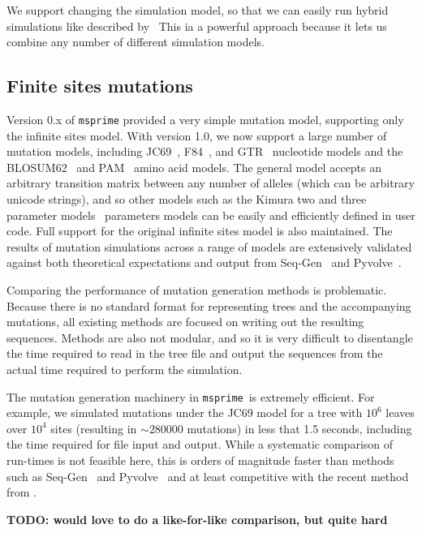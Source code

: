 \documentclass{article}
\newcommand{\msprime}[0]{\texttt{msprime}}
\begin{document}
We support changing the simulation model, so that we can easily
run hybrid simulations like described by~\cite{bhaskar2014distortion}
This ia a powerful approach because it lets us combine any
number of different simulation models.


\subsection*{Finite sites mutations}
Version 0.x of \texttt{msprime} provided a very simple mutation model,
supporting only the infinite sites model.
With version 1.0, we now support a large number of mutation models,
including
JC69~\citep{jukes1969evolution},
F84~\citep{felsenstein1996hidden},
and GTR~\citep{tavare1986some} nucleotide models
and the BLOSUM62~\citep{henikoff1992amino}
and PAM~\citep{dayhoff1978} amino acid models.
The general model accepts an arbitrary transition matrix between
any number of alleles (which can be arbitrary unicode strings),
and so other models such as the Kimura two and three
parameter models~\citep{kimura1980simple,kimura1981estimation}
parameters models can be easily
and efficiently defined in user code.
Full support for the original infinite sites model is also maintained.
The results of mutation simulations across a range of models are
extensively validated
against both theoretical expectations and output from
Seq-Gen~\citep{rambaut1997seq} and
Pyvolve~\citep{spielman2015pyvolve}.

Comparing the performance of mutation generation methods is problematic.
Because there is no standard format for representing trees and
the accompanying mutations, all existing methods are focused on
writing out the resulting sequences. Methods are also not modular,
and so it is very difficult to disentangle the time required to
read in the tree file and output the sequences from the actual
time required to perform the simulation.

The mutation generation machinery in \msprime\ is extremely
efficient. For example, we simulated mutations under the JC69
model for a tree with $10^6$ leaves over $10^4$ sites (resulting
in $\sim 280000$ mutations) in less that 1.5 seconds, including
the time required for file input and output. While a systematic
comparison of run-times is not feasible here, this is orders
of magnitude faster than methods such as
Seq-Gen~\citep{rambaut1997seq} and
Pyvolve~\citep{spielman2015pyvolve}
and at least competitive with the recent method from
\cite{demaio2021phastsim}.

\textbf{TODO: would love to do a like-for-like comparison, but quite hard}
\end{document}
